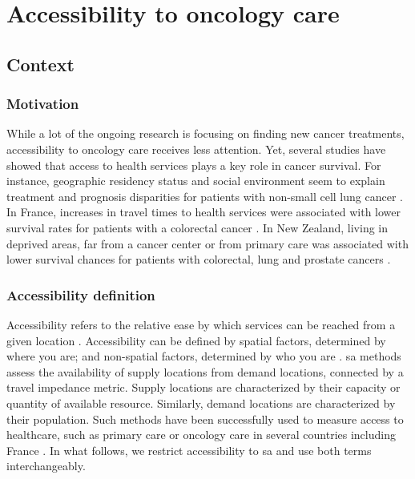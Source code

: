 \chapter{Accessibility to oncology care}

\section{Context}

\subsection{Motivation}

While a lot of the ongoing research is focusing on finding new cancer treatments, accessibility to oncology care receives less attention. Yet, several studies have showed that access to health services plays a key role in cancer survival. For instance, geographic residency status and social environment seem to explain treatment and prognosis disparities for patients with non-small cell lung cancer \cite{johnson_treatment_2014}. In France, increases in travel times to health services were associated with lower survival rates for patients with a colorectal cancer \cite{dejardin_influence_2014}. In New Zealand, living in deprived areas, far from a cancer center or from primary care was associated with lower survival chances for patients with colorectal, lung and prostate cancers \cite{haynes_cancer_2008}.

\subsection{Accessibility definition}

Accessibility refers to the relative ease by which services can be reached from a given location \cite{wang_measurement_2012}. Accessibility can be defined by spatial factors, determined by where you are; and non-spatial factors, determined by who you are \cite{khan_integrated_1992}. \ac{sa} methods assess the availability of supply locations from demand locations, connected by a travel impedance metric. Supply locations are characterized by their capacity or quantity of available resource. Similarly, demand locations are characterized by their population. Such methods have been successfully used to measure access to healthcare, such as primary care \cite{guagliardo_spatial_2004} or oncology care \cite{wang_measurement_2012,zahnd_spatial_2021,alahmadi_spatial_2013} in several countries including France \cite{launay_methodology_2019,gusmano_disparities_2014,gao_assessment_2016}. In what follows, we restrict accessibility to \acf{sa} and use both terms interchangeably.

